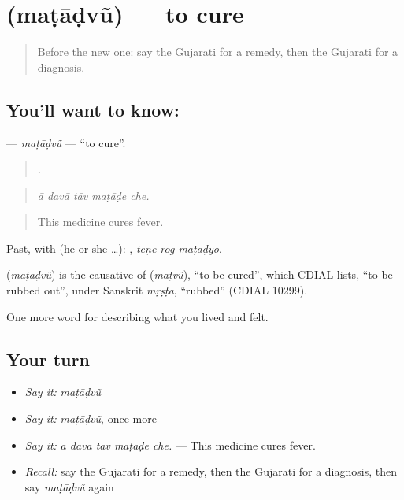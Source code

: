 \section[\texorpdfstring{\gu{મટાડવું} (maṭāḍvũ)}{મટાડવું (maṭāḍvũ)}]{ (maṭāḍvũ) — to cure}

\label{lesson:GU-C484-matadvu}



\begin{quote}
Before the new one: say the Gujarati for a remedy, then the Gujarati for a diagnosis.
\end{quote}

\subsection*{You'll want to know: }
\textbf{} — \emph{maṭāḍvũ} — \textquotedblleft{}to cure\textquotedblright{}.

\begin{quote}
    .
\end{quote}

\begin{quote}
\emph{ā davā tāv maṭāḍe che.}
\end{quote}

\begin{quote}
This medicine cures fever.
\end{quote}

Past, with  (he or she …):   , \emph{teṇe rog maṭāḍyo}.

\begin{cousinweb}
\textbf{} (\emph{maṭāḍvũ}) is the causative of \textbf{} (\emph{maṭvũ}), \textquotedblleft{}to be cured\textquotedblright{}, which CDIAL lists, \textquotedblleft{}to be rubbed out\textquotedblright{}, under Sanskrit \emph{mṛṣṭa}, \textquotedblleft{}rubbed\textquotedblright{} (CDIAL 10299).
\end{cousinweb}

\begin{grammarlens}[title={What you've built}]
One more word for describing what you lived and felt.
\end{grammarlens}

\subsection*{Your turn}
\begin{itemize}
\raggedright
  \item \emph{Say it:} \emph{maṭāḍvũ}
  \item \emph{Say it:} \emph{maṭāḍvũ}, once more
  \item \emph{Say it:} \emph{ā davā tāv maṭāḍe che.} — This medicine cures fever.
  \item \emph{Recall:} say the Gujarati for a remedy, then the Gujarati for a diagnosis, then say \emph{maṭāḍvũ} again
\end{itemize}

